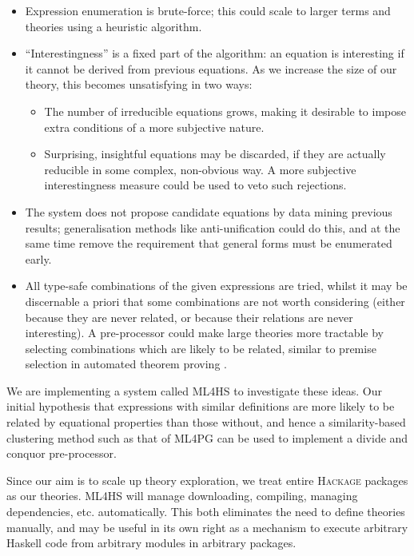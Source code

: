 \documentclass[]{article}
\providecommand{\tightlist}{%
  \setlength{\itemsep}{0pt}\setlength{\parskip}{0pt}}
\begin{document}
\begin{itemize}
\tightlist
\item
  Expression enumeration is brute-force; this could scale to larger
  terms and theories using a heuristic algorithm.
\item
  ``Interestingness'' is a fixed part of the algorithm: an equation is
  interesting if it cannot be derived from previous equations. As we
  increase the size of our theory, this becomes unsatisfying in two
  ways:

  \begin{itemize}
  \tightlist
  \item
    The number of irreducible equations grows, making it desirable to
    impose extra conditions of a more subjective nature.
  \item
    Surprising, insightful equations may be discarded, if they are
    actually reducible in some complex, non-obvious way. A more
    subjective interestingness measure could be used to veto such
    rejections.
  \end{itemize}
\item
  The system does not propose candidate equations by data mining
  previous results; generalisation methods like anti-unification could
  do this, and at the same time remove the requirement that general
  forms must be enumerated early.
\item
  All type-safe combinations of the given expressions are tried, whilst
  it may be discernable a priori that some combinations are not worth
  considering (either because they are never related, or because their
  relations are never interesting). A pre-processor could make large
  theories more tractable by selecting combinations which are likely to
  be related, similar to premise selection in automated theorem proving
  \cite{kuhlwein2012overview}.
\end{itemize}

We are implementing a system called \textsc{ML4HS} to investigate these
ideas. Our initial hypothesis that expressions with similar definitions
are more likely to be related by equational properties than those
without, and hence a similarity-based clustering method such as that of
\textsc{ML4PG} \cite{journals/corr/abs-1302-6421} can be used to implement
a divide and conquor pre-processor.

Since our aim is to scale up theory exploration, we treat entire
\textsc{Hackage} packages as our theories. \textsc{ML4HS} will manage
downloading, compiling, managing dependencies, etc. automatically. This
both eliminates the need to define theories manually, and may be useful
in its own right as a mechanism to execute arbitrary Haskell code from
arbitrary modules in arbitrary packages.
\end{document}
